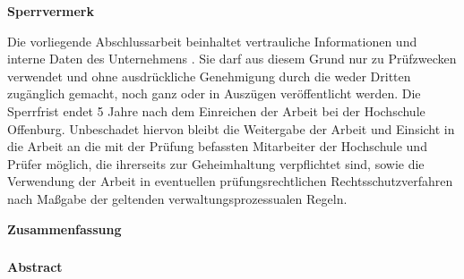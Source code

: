 %
{%
\vspace{5cm}
\color{red}\textsf{\large\textbf{Sperrvermerk}}

Die vorliegende Abschlussarbeit beinhaltet vertrauliche Informationen und interne Daten des Unternehmens \hsmafirma.
Sie darf aus diesem Grund nur zu Prüfzwecken verwendet und ohne ausdrückliche Genehmigung durch die \hsmafirma  weder Dritten zugänglich gemacht, noch ganz oder in Auszügen veröffentlicht werden. Die Sperrfrist endet 5 Jahre nach dem Einreichen der Arbeit bei der Hochschule Offenburg. Unbeschadet hiervon bleibt die Weitergabe der Arbeit und Einsicht in die Arbeit an die mit der Prüfung befassten Mitarbeiter der Hochschule und Prüfer möglich, die ihrerseits zur Geheimhaltung verpflichtet sind, sowie die Verwendung der Arbeit in eventuellen prüfungsrechtlichen Rechtsschutzverfahren nach Maßgabe der geltenden verwaltungsprozessualen Regeln.
\color{black}
}{}

\cleardoublepage

\thispagestyle{empty}
\textsf{\large\textbf{Zusammenfassung}}
\subsubsection*{\hsmatitelde}\hsmaabstractde
\clearpage
\thispagestyle{empty}
\textsf{\large\textbf{Abstract}}
\subsubsection*{\hsmatitelen}\hsmaabstracten

